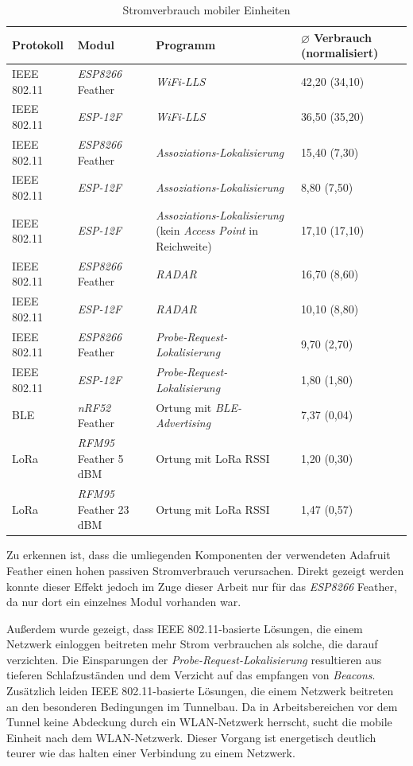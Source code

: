 \begin{table}[h]
	\centering
	\caption{Stromverbrauch mobiler Einheiten}
	\label{table:consumptions}
	\begin{tabular}{l|p{3.2cm}|p{5.5cm}|R{2.5cm}}
		Protokoll & Modul & Programm  & $\varnothing$ Verbrauch (normalisiert)\\
		\hline
		IEEE 802.11 & \emph{ESP8266} Feather & \emph{WiFi-LLS} & 42,20 (34,10)\\
		IEEE 802.11 & \emph{ESP-12F} & \emph{WiFi-LLS} & 36,50 (35,20)\\
		IEEE 802.11 & \emph{ESP8266} Feather & \emph{Assoziations-Lokalisierung} & 15,40 (7,30) \\
		IEEE 802.11 & \emph{ESP-12F} & \emph{Assoziations-Lokalisierung} & 8,80 (7,50)\\
		IEEE 802.11 & \emph{ESP-12F} & \emph{Assoziations-Lokalisierung} (kein \emph{Access Point} in Reichweite) & 17,10 (17,10)\\
		\hline
		IEEE 802.11 & \emph{ESP8266} Feather & \emph{RADAR} & 16,70 (8,60)\\
		IEEE 802.11 & \emph{ESP-12F} & \emph{RADAR} & 10,10 (8,80) \\
		IEEE 802.11 & \emph{ESP8266} Feather & \emph{Probe-Request-Lokalisierung} & 9,70 (2,70)\\
		IEEE 802.11 & \emph{ESP-12F} & \emph{Probe-Request-Lokalisierung} & 1,80 (1,80)\\
		\hline
		BLE & \emph{nRF52} Feather & Ortung mit \emph{BLE-Advertising} & 7,37 (0,04)\\
		\hline
		LoRa & \emph{RFM95} Feather 5 dBM & Ortung mit LoRa RSSI & 1,20 (0,30)\\
		LoRa & \emph{RFM95} Feather 23 dBM & Ortung mit LoRa RSSI & 1,47 (0,57)\\
	\end{tabular}
\end{table}

Zu erkennen ist, dass die umliegenden Komponenten der verwendeten Adafruit Feather einen hohen passiven Stromverbrauch verursachen.
Direkt gezeigt werden konnte dieser Effekt jedoch im Zuge dieser Arbeit nur für das \emph{ESP8266} Feather, da nur dort ein einzelnes Modul vorhanden war.

Außerdem wurde gezeigt, dass IEEE 802.11-basierte Lösungen, die einem Netzwerk einloggen beitreten mehr Strom verbrauchen als solche, die darauf verzichten.
Die Einsparungen der \emph{Probe-Request-Lokalisierung} resultieren aus tieferen Schlafzuständen und dem Verzicht auf das empfangen von \emph{Beacons}.
Zusätzlich leiden IEEE 802.11-basierte Lösungen, die einem Netzwerk beitreten an den besonderen Bedingungen im Tunnelbau.
Da in Arbeitsbereichen vor dem Tunnel keine Abdeckung durch ein WLAN-Netzwerk herrscht, sucht die mobile Einheit nach dem WLAN-Netzwerk.
Dieser Vorgang ist energetisch deutlich teurer wie das halten einer Verbindung zu einem Netzwerk.

